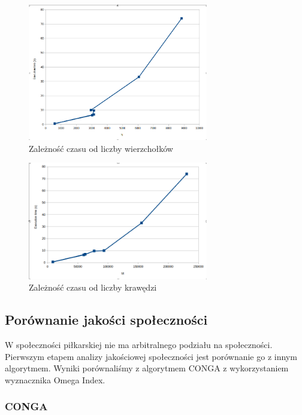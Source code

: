 \documentclass{article}
\begin{document}
\begin{figure}[H]
    \centering
    \includegraphics[width=0.7\textwidth]{images/time_vert.png}
    \caption{Zależność czasu od liczby wierzchołków}
    \label{fig:my_label}
\end{figure}

\begin{figure}[H]
    \centering
    \includegraphics[width=0.7\textwidth]{images/time_edges.png}
    \caption{Zależność czasu od liczby krawędzi}
    \label{fig:my_label}
\end{figure}

\subsection{Porównanie jakości społeczności}
W społeczności piłkarskiej nie ma arbitralnego podziału na społeczności. Pierwszym etapem analizy jakościowej społeczności jest porównanie go z innym algorytmem. Wyniki porównaliśmy z algorytmem CONGA z wykorzystaniem wyznacznika Omega Index.

\subsubsection{CONGA}
\end{document}
